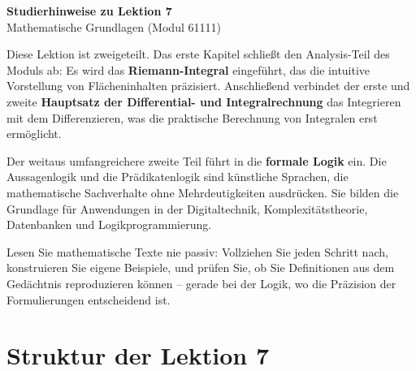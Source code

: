 \documentclass[a4paper,12pt]{article}
\begin{document}
\begin{center}
  {\LARGE\bfseries Studierhinweise zu Lektion 7}\\[0.5em]
  {\large Mathematische Grundlagen (Modul 61111)}
\end{center}

\vspace{1em}

Diese Lektion ist zweigeteilt. Das erste Kapitel schließt den Analysis-Teil des
Moduls ab: Es wird das \textbf{Riemann-Integral} eingeführt, das die intuitive
Vorstellung von Flächeninhalten präzisiert. Anschließend verbindet der erste und
zweite \textbf{Hauptsatz der Differential- und Integralrechnung} das Integrieren
mit dem Differenzieren, was die praktische Berechnung von Integralen erst
ermöglicht.

Der weitaus umfangreichere zweite Teil führt in die \textbf{formale Logik} ein.
Die Aussagenlogik und die Prädikatenlogik sind künstliche Sprachen, die
mathematische Sachverhalte ohne Mehrdeutigkeiten ausdrücken. Sie bilden die
Grundlage für Anwendungen in der Digitaltechnik, Komplexitätstheorie,
Datenbanken und Logikprogrammierung.

Lesen Sie mathematische Texte nie passiv: Vollziehen Sie jeden Schritt nach,
konstruieren Sie eigene Beispiele, und prüfen Sie, ob Sie Definitionen aus dem
Gedächtnis reproduzieren können -- gerade bei der Logik, wo die Präzision der
Formulierungen entscheidend ist.

\section*{Struktur der Lektion 7}
\end{document}
